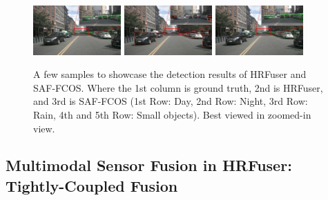 \documentclass[report.tex]{subfiles}
\begin{document}
\begin{figure}[h!]
        \includegraphics[width=0.3\textwidth]{images/results/saf_vs_hrfuser/samples/s2_small/n008-2018-08-01-15-34-25-0400__CAM_FRONT__1533152641412404_gt_2.jpg}
        \includegraphics[width=0.3\textwidth]{images/results/saf_vs_hrfuser/samples/s2_small/n008-2018-08-01-15-34-25-0400__CAM_FRONT__1533152641412404_former_2.jpg}
        \includegraphics[width=0.3\textwidth]{images/results/saf_vs_hrfuser/samples/s2_small/n008-2018-08-01-15-34-25-0400__CAM_FRONT__1533152641412404_2.jpg}
      
        \caption{A few samples to showcase the detection results of HRFuser and SAF-FCOS. Where the 1st column is ground truth, 2nd is HRFuser, and 3rd is SAF-FCOS (1st Row: Day, 2nd Row: Night, 3rd Row: Rain, 4th and 5th Row: Small objects). Best viewed in zoomed-in view.}
        \label{fig:saf_vs_hrfuser}
      \end{figure}
    

    \subsection{Multimodal Sensor Fusion in HRFuser: Tightly-Coupled Fusion}

\end{document}
